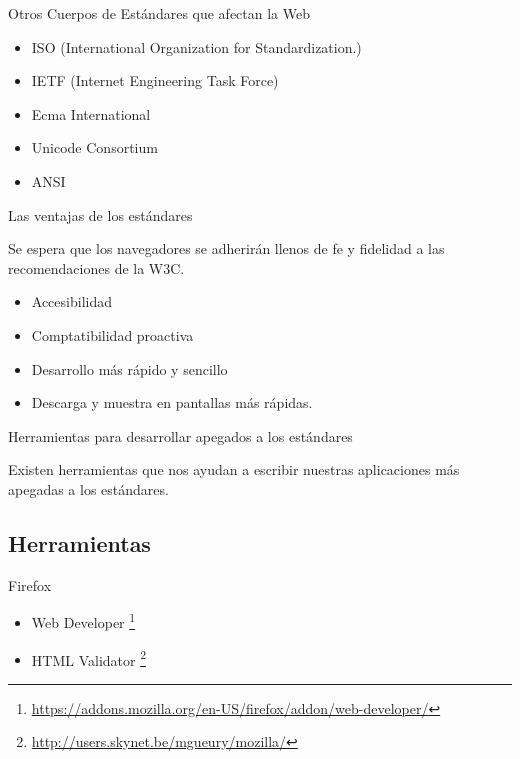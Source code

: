 \documentclass{beamer}
\begin{document}
\begin{frame}{Otros Cuerpos de Estándares que afectan la Web} %
    \begin{itemize}
        \item ISO (International Organization for Standardization.)
        \item IETF (Internet Engineering Task Force) 
        \item Ecma International
        \item Unicode Consortium
        \item ANSI
    \end{itemize}
\end{frame}

\begin{frame}{Las ventajas de los estándares} %
    \begin{center}
    Se espera que los navegadores se adherirán llenos de fe y fidelidad a las
    recomendaciones de la W3C. 
    \end{center}
    \begin{itemize}
        \item Accesibilidad
        \item Comptatibilidad proactiva
        \item Desarrollo más rápido y sencillo 
        \item Descarga y muestra en pantallas más rápidas. 
    \end{itemize}
\end{frame}

\begin{frame}{Herramientas para desarrollar apegados a los estándares} %
    \begin{center}
    Existen herramientas que nos ayudan a escribir nuestras aplicaciones más
    apegadas a los estándares.
    \end{center}
\end{frame}

\subsection{Herramientas}

\begin{frame}{Firefox} %
    \begin{center}
    \begin{itemize}
        \item Web Developer \footnote{\url{https://addons.mozilla.org/en-US/firefox/addon/web-developer/}}
        \item HTML Validator \footnote{\url{http://users.skynet.be/mgueury/mozilla/}}
    \end{itemize}
    \end{center}
\end{frame}
\end{document}
